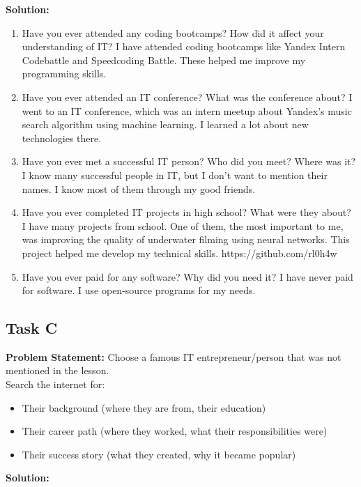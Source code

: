 \documentclass[a4paper,12pt]{article}
\begin{document}
\textbf{Solution:}

\begin{enumerate}
            \item Have you ever attended any coding bootcamps? How did it affect your understanding of IT? I have attended coding bootcamps like Yandex Intern Codebattle and Speedcoding Battle. These helped me improve my programming skills.
            \item Have you ever attended an IT conference? What was the conference about? I went to an IT conference, which was an intern meetup about Yandex's music search algorithm using machine learning. I learned a lot about new technologies there.
            \item Have you ever met a successful IT person? Who did you meet? Where was it? I know many successful people in IT, but I don’t want to mention their names. I know most of them through my good friends.
            \item Have you ever completed IT projects in high school? What were they about? I have many projects from school. One of them, the most important to me, was improving the quality of underwater filming using neural networks. This project helped me develop my technical skills. https://github.com/rl0h4w
            \item Have you ever paid for any software? Why did you need it? I have never paid for software. I use open-source programs for my needs.         
\end{enumerate}

\vspace{1cm}

\subsection{Task C}
\textbf{Problem Statement:}
     Choose a famous IT entrepreneur/person that was not mentioned in the lesson.\\
    Search the internet for:
    \begin{itemize}
        \item Their background (where they are from, their education)
        \item Their career path (where they worked, what their responsibilities were)
        \item Their success story (what they created, why it became popular)
    \end{itemize}

\textbf{Solution:}
\end{document}
